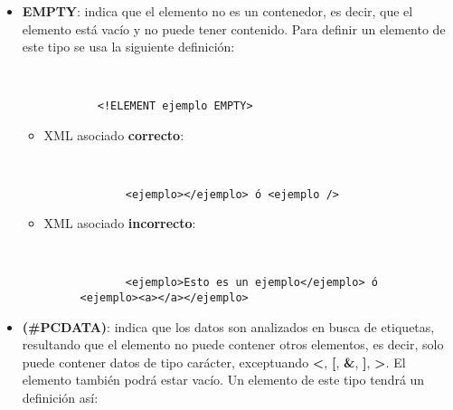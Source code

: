 \begin{itemize}
    \item \textbf{EMPTY}: indica que el elemento no es un contenedor, es decir, que el elemento está vacío y no puede tener contenido. Para definir un elemento de este tipo se usa la siguiente definición:

        \begin{figure}[h]
        \begin{tcolorbox}[sharp corners, colback=yellow!30, colframe=white!20]
            \scriptsize
            \begin{verbatim}


      <!ELEMENT ejemplo EMPTY>
            \end{verbatim}
        \end{tcolorbox}
    \end{figure}

    \begin{itemize}
        \item XML asociado \textbf{correcto}:

     \begin{figure}[h]
        \begin{tcolorbox}[sharp corners, colback=yellow!30, colframe=white!20]
           \scriptsize
           \begin{verbatim}


       <ejemplo></ejemplo> ó <ejemplo />
           \end{verbatim}
       \end{tcolorbox}
    \end{figure}

    \item XML asociado \textbf{incorrecto}:

     \begin{figure}[h]
        \begin{tcolorbox}[sharp corners, colback=yellow!30, colframe=white!20]
            \scriptsize
            \begin{verbatim}


       <ejemplo>Esto es un ejemplo</ejemplo> ó <ejemplo><a></a></ejemplo>
            \end{verbatim}
        \end{tcolorbox}
     \end{figure}
    \end{itemize}

    \item \textbf{(\#PCDATA)}: indica que los datos son analizados en busca de etiquetas, resultando que el elemento no puede contener otros elementos, es decir, solo puede contener datos de tipo carácter, exceptuando \textbf{<}, \textbf{[}, \textbf{\&}, \textbf{]}, \textbf{>}. El elemento también podrá estar vacío. Un elemento de este tipo tendrá un definición así:


\end{itemize}
